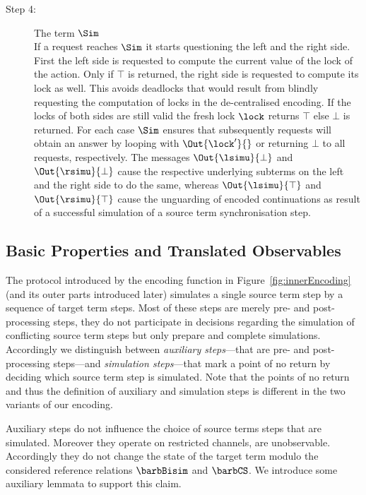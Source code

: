 \documentclass[]{eptcs}
\begin{document}
\begin{description}
	\item[Step 4:] The term $ \Sim $\\
		If a request reaches $ \Sim $ it starts questioning the left and the right side. First the left side is requested to compute the current value of the lock of the action. Only if $ \top $ is returned, the right side is requested to compute its lock as well. This avoids deadlocks that would result from blindly requesting the computation of locks in the de-centralised encoding. If the locks of both sides are still valid the fresh lock $ \lock $ returns $ \top $ else $ \bot $ is returned. For each case $ \Sim $ ensures that subsequently requests will obtain an answer by looping with $ \Out{\lock'}{} $ or returning $ \bot $ to all requests, respectively. The messages $ \Out{\lsimu}{\bot} $ and $ \Out{\rsimu}{\bot} $ cause the respective underlying subterms on the left and the right side to do the same, whereas $ \Out{\lsimu}{\top} $ and $ \Out{\rsimu}{\top} $ cause the unguarding of encoded continuations as result of a successful simulation of a source term synchronisation step.
\end{description}

\subsection{Basic Properties and Translated Observables}

The protocol introduced by the encoding function in Figure~\ref{fig:innerEncoding} (and its outer parts introduced later) simulates a single source term step by a sequence of target term steps. Most of these steps are merely pre- and post-processing steps, \ie they do not participate in decisions regarding the simulation of conflicting source term steps but only prepare and complete simulations. Accordingly we distinguish between \emph{auxiliary steps}---that are pre- and post-processing steps---and \emph{simulation steps}---that mark a point of no return by deciding which source term step is simulated. Note that the points of no return and thus the definition of auxiliary and simulation steps is different in the two variants of our encoding.

Auxiliary steps do not influence the choice of source terms steps that are simulated. Moreover they operate on restricted channels, \ie are unobservable. Accordingly they do not change the state of the target term modulo the considered reference relations $ \barbBisim $ and $ \barbCS $. We introduce some auxiliary lemmata to support this claim.
\end{document}
